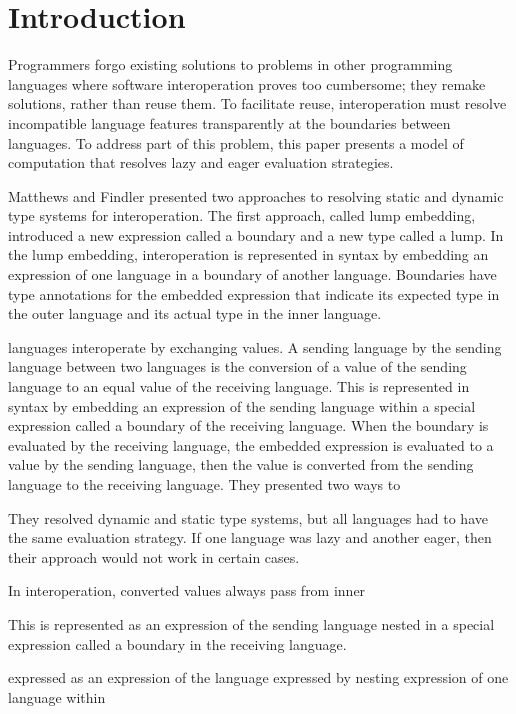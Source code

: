 \section{Introduction}

Programmers forgo existing solutions to problems in other programming languages where software interoperation proves too cumbersome; they remake solutions, rather than reuse them. To facilitate reuse, interoperation must resolve incompatible language features transparently at the boundaries between languages. To address part of this problem, this paper presents a model of computation that resolves lazy and eager evaluation strategies.




Matthews and Findler presented \cite{matthews07} two approaches to resolving static and dynamic type systems for interoperation. The first approach, called lump embedding, introduced a new expression called a boundary and a new type called a lump. In the lump embedding, interoperation is represented in syntax by embedding an expression of one language in a boundary of another language. Boundaries have type annotations for the embedded expression that indicate its expected type in the outer language and its actual type in the inner language. 



languages interoperate by exchanging values. A sending language  by the sending language between two languages is the conversion of a value of the sending language to an equal value of the receiving language. This is represented in syntax by embedding an expression of the sending language within a special expression called a boundary of the receiving language. When the boundary is evaluated by the receiving language, the embedded expression is evaluated to a value by the sending language, then the value is converted from the sending language to the receiving language. They presented two ways to 

They resolved dynamic and static type systems, but all languages had to have the same evaluation strategy. If one language was lazy and another eager, then their approach would not work in certain cases.

In interoperation, converted values always pass from inner

 This is represented as an expression of the sending language nested in a special expression called a boundary in the receiving language. 

 expressed as an expression of the  language 
 expressed by nesting expression of one language within 

